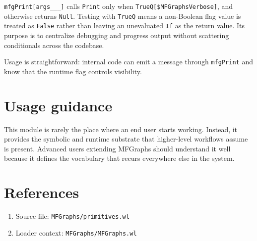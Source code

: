 \documentclass[11pt]{article}
\begin{document}
\texttt{mfgPrint[args\_\_\_]} calls \texttt{Print} only when \texttt{TrueQ[\$MFGraphsVerbose]}, and otherwise returns \texttt{Null}. Testing with \texttt{TrueQ} means a non-Boolean flag value is treated as \texttt{False} rather than leaving an unevaluated \texttt{If} as the return value. Its purpose is to centralize debugging and progress output without scattering conditionals across the codebase.

Usage is straightforward: internal code can emit a message through \texttt{mfgPrint} and know that the runtime flag controls visibility.

\section{Usage guidance}

This module is rarely the place where an end user starts working. Instead, it provides the symbolic and runtime substrate that higher-level workflows assume is present. Advanced users extending MFGraphs should understand it well because it defines the vocabulary that recurs everywhere else in the system.

\section*{References}

\begin{enumerate}
\item Source file: \texttt{MFGraphs/primitives.wl}
\item Loader context: \texttt{MFGraphs/MFGraphs.wl}
\end{enumerate}
\end{document}
